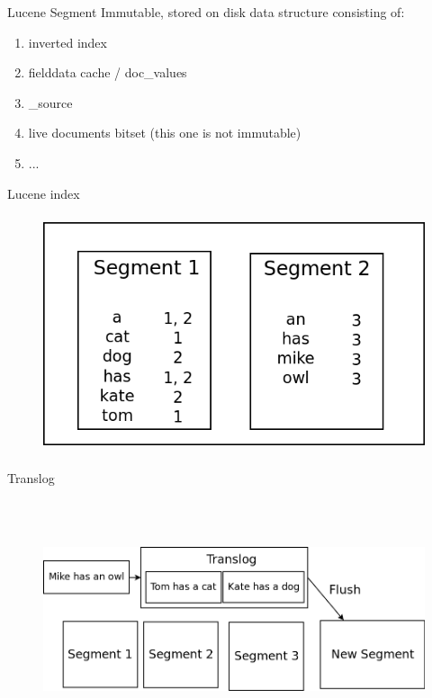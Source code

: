 \documentclass{beamer}
\begin{document}
\begin{frame}{Lucene Segment}
	Immutable, stored on disk data structure consisting of:
	\begin{enumerate}
		\item inverted index
		\item fielddata cache / doc\_values
		\item \_source
		\item live documents bitset (this one is not immutable)
		\item ...
	\end{enumerate}
\end{frame}

\begin{frame}{Lucene index}
	\begin{figure}
		\includegraphics[width=\textwidth,height=7cm,keepaspectratio=true]{lucene-index}
	\end{figure}
\end{frame}

\begin{frame}{Translog}
	\begin{figure}
		\includegraphics[width=\textwidth,height=7cm,keepaspectratio=true]{translog}
	\end{figure}
\end{frame}
\end{document}
